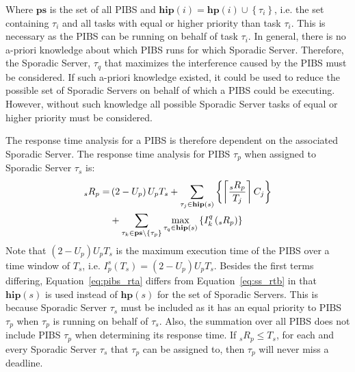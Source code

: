 Where $\mathbf{ps}$ is the set of all PIBS and \mbox{$\mathbf{hip}\left(i\right)
  {=} \mathbf{hp}\left(i\right)\cup\left\{\tau_i\right\}$}, i.e. the set
containing $\tau_i$ and all tasks with equal or higher priority than task
$\tau_i$.  This is necessary as the PIBS can be running on behalf of task
$\tau_i$.  In general, there is no a-priori knowledge about which PIBS runs for
which Sporadic Server.  Therefore, the Sporadic Server, $\tau_q$ that maximizes
the interference caused by the PIBS must be considered.  If such a-priori knowledge
existed, it could be used to reduce the possible set of Sporadic Servers on
  behalf of which a PIBS could be executing. However, without such knowledge all possible
Sporadic Server tasks of equal or higher priority must be considered.

The response time analysis for a PIBS is therefore dependent on the associated
Sporadic Server.  The response time analysis for PIBS $\tau_p$ when assigned to
Sporadic Server $\tau_s$ is:
\begin{align} \label{eq:pibs_rta}
  _{s}R_p = &\left(2-U_p\right)U_pT_s +
  \sum_{\tau_j\in\mathbf{hip}\left(s\right)} \left\{ \left\lceil \frac{_{s}R_p}{T_j}
    \right\rceil C_j\right\} \notag \\ &+
  \sum_{\substack{\tau_k \in \mathbf{ps} \setminus \left\{\tau_p\right\}}}
  \max_{\tau_q \in
    \mathbf{hip}\left(s\right)}\left\{I_k^q\left(_{s}R_p\right)\right\}
\end{align}
Note that $\left(2{-}U_p\right)U_pT_s$ is the maximum execution time of the PIBS
over a time window of $T_s$, i.e.  $I_p^s\left(T_s\right) {=}
\left(2{-}U_p\right)U_pT_s$.  Besides the first terms differing,
Equation~\ref{eq:pibs_rta} differs from Equation~\ref{eq:ss_rtb} in that
$\mathbf{hip}\left(s\right)$ is used instead of $\mathbf{hp}\left(s\right)$
for the set of Sporadic Servers.  This is because Sporadic Server $\tau_s$
must be included as it has an equal priority to PIBS $\tau_p$ when $\tau_p$ is
running on behalf of $\tau_s$.  Also, the summation over all PIBS does not
include PIBS $\tau_p$ when determining its response time.  If
$_{s}R_p{\leq}T_s$, for each and every Sporadic Server $\tau_s$ that $\tau_p$
can be assigned to, then $\tau_p$ will never miss a deadline.













